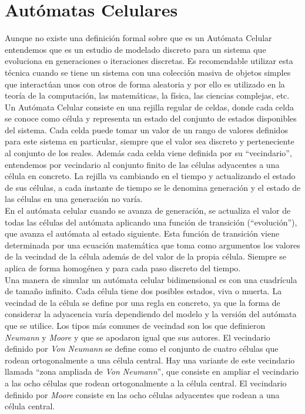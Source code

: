 \section{Autómatas Celulares}
Aunque no existe una definición formal sobre que es un Autómata Celular entendemos que es un estudio de modelado discreto para un sistema que evoluciona en generaciones o iteraciones discretas. Es recomendable utilizar esta técnica cuando se tiene un sistema con una colección masiva de objetos simples que interactúan unos con otros de forma aleatoria y por ello es utilizado en la teoría de la computación, las matemáticas, la física, las ciencias complejas, etc. \\

Un Autómata Celular consiste en una rejilla regular de celdas, donde cada celda se conoce como célula y representa un estado del conjunto de estados disponibles del sistema. Cada celda puede tomar un valor de un rango de valores definidos para este sistema en particular, siempre que el valor sea discreto y perteneciente al conjunto de los reales. Además cada celda viene definida por su ``vecindario'', entendemos por vecindario al conjunto finito de las células adyacentes a una célula en concreto.  La rejilla va cambiando en el tiempo y actualizando el estado de sus células, a cada instante de tiempo se le denomina generación y el estado de las células en una generación no varía.  \\


En el autómata celular cuando se avanza de generación, se actualiza el valor de todas las células del autómata aplicando una función de transición (``evolución''), que avanza el autómata al estado siguiente. Esta función de transición viene determinada por una ecuación matemática que toma como argumentos los valores de la vecindad de la célula además de del valor de la propia célula. Siempre se aplica de forma homogénea y para cada paso discreto del tiempo.\\

Una manera de simular un autómata celular bidimensional es con una cuadrícula de tamaño infinito. Cada célula tiene dos posibles estados, viva o muerta. La vecindad de la célula se define por una regla en concreto, ya que la forma de considerar la adyacencia varía dependiendo del modelo y la versión del autómata que se utilice. Los tipos más comunes de vecindad son los que definieron \textit{Neumann} y \textit{Moore} y que se apodaron igual que sus autores. El vecindario definido por \textit{Von Neumann} se define como el conjunto de cuatro células que rodean ortogonalmente a una célula central. Hay una variante de este vecindario llamada ``zona ampliada de \textit{Von Neumann}'', que consiste en ampliar el vecindario a las ocho células que rodean ortogonalmente a la célula central. El vecindario definido por \textit{Moore} consiste en las ocho células adyacentes que rodean a una célula central.\\


